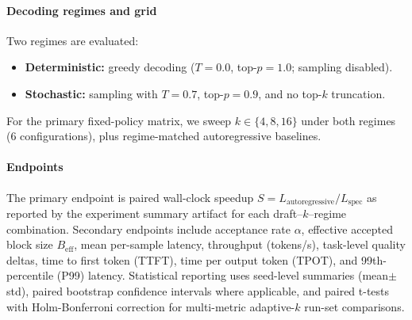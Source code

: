 \paragraph{Decoding regimes and grid}
Two regimes are evaluated:
\begin{itemize}
    \item \textbf{Deterministic:} greedy decoding ($T{=}0.0$, top-$p{=}1.0$; sampling disabled).
    \item \textbf{Stochastic:} sampling with $T{=}0.7$, top-$p{=}0.9$, and no top-$k$ truncation.
\end{itemize}
For the primary fixed-policy matrix, we sweep $k\in\{4,8,16\}$ under both
regimes (6 configurations), plus regime-matched autoregressive baselines.

\paragraph{Endpoints}
The primary endpoint is paired wall-clock speedup
$S = L_{\text{autoregressive}}/L_{\text{spec}}$ as reported by the experiment summary
artifact for each draft--$k$--regime combination.
Secondary endpoints include acceptance rate $\alpha$, effective accepted block
size $B_{\text{eff}}$, mean per-sample latency, throughput (tokens/s),
task-level quality deltas, time to first token (TTFT), time per output token
(TPOT), and 99th-percentile (P99) latency. Statistical reporting uses
seed-level summaries (mean$\pm$std), paired
bootstrap confidence intervals where applicable, and paired t-tests with
Holm-Bonferroni correction for multi-metric adaptive-$k$ run-set comparisons.
